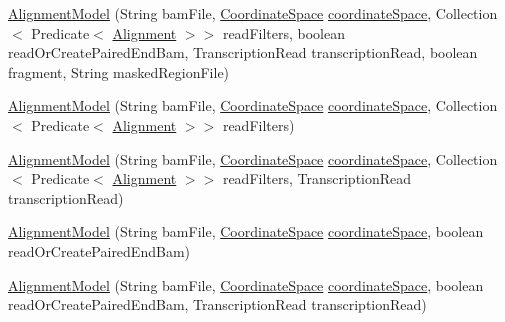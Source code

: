 \begin{DoxyCompactItemize}
\item 
\hyperlink{classumms_1_1core_1_1model_1_1_alignment_model_a34760796b462ef196afd99507742b655}{Alignment\+Model} (String bam\+File, \hyperlink{interfaceumms_1_1core_1_1coordinatesystem_1_1_coordinate_space}{Coordinate\+Space} \hyperlink{classumms_1_1core_1_1model_1_1_alignment_model_a39ef275175b500df6548f8ec18949dfe}{coordinate\+Space}, Collection$<$ Predicate$<$ \hyperlink{interfaceumms_1_1core_1_1alignment_1_1_alignment}{Alignment} $>$$>$ read\+Filters, boolean read\+Or\+Create\+Paired\+End\+Bam, Transcription\+Read transcription\+Read, boolean fragment, String masked\+Region\+File)
\item 
\hyperlink{classumms_1_1core_1_1model_1_1_alignment_model_a47d629ed96cf0a40fca90705bdfb7bcc}{Alignment\+Model} (String bam\+File, \hyperlink{interfaceumms_1_1core_1_1coordinatesystem_1_1_coordinate_space}{Coordinate\+Space} \hyperlink{classumms_1_1core_1_1model_1_1_alignment_model_a39ef275175b500df6548f8ec18949dfe}{coordinate\+Space}, Collection$<$ Predicate$<$ \hyperlink{interfaceumms_1_1core_1_1alignment_1_1_alignment}{Alignment} $>$$>$ read\+Filters)
\item 
\hyperlink{classumms_1_1core_1_1model_1_1_alignment_model_a6644d4e1ac91a5a6d3c018761cf13530}{Alignment\+Model} (String bam\+File, \hyperlink{interfaceumms_1_1core_1_1coordinatesystem_1_1_coordinate_space}{Coordinate\+Space} \hyperlink{classumms_1_1core_1_1model_1_1_alignment_model_a39ef275175b500df6548f8ec18949dfe}{coordinate\+Space}, Collection$<$ Predicate$<$ \hyperlink{interfaceumms_1_1core_1_1alignment_1_1_alignment}{Alignment} $>$$>$ read\+Filters, Transcription\+Read transcription\+Read)
\item 
\hyperlink{classumms_1_1core_1_1model_1_1_alignment_model_aeb41305d4dd61618151384ec47123f0a}{Alignment\+Model} (String bam\+File, \hyperlink{interfaceumms_1_1core_1_1coordinatesystem_1_1_coordinate_space}{Coordinate\+Space} \hyperlink{classumms_1_1core_1_1model_1_1_alignment_model_a39ef275175b500df6548f8ec18949dfe}{coordinate\+Space}, boolean read\+Or\+Create\+Paired\+End\+Bam)
\item 
\hyperlink{classumms_1_1core_1_1model_1_1_alignment_model_ac571c4bd3818f884a7880f19271e0c95}{Alignment\+Model} (String bam\+File, \hyperlink{interfaceumms_1_1core_1_1coordinatesystem_1_1_coordinate_space}{Coordinate\+Space} \hyperlink{classumms_1_1core_1_1model_1_1_alignment_model_a39ef275175b500df6548f8ec18949dfe}{coordinate\+Space}, boolean read\+Or\+Create\+Paired\+End\+Bam, Transcription\+Read transcription\+Read)
\item 
$$
\end{DoxyCompactItemize}
